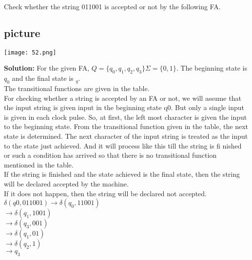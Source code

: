 \documentclass{article}
\begin{document}
\hspace*{0.1cm} Check whether the string 011001 is accepted or not by the following FA.\\
\vspace*{0.1cm}

\begin{center}
\section{picture}
\texttt{[image: 52.png]}
\end{center}

\vspace*{0.1cm}

\textbf{Solution:} For the given FA, $Q = \{q_{0}, q_{1}, q_{2}, q_{3}\} \Sigma = \{0, 1\}$. The beginning state is $q_{0}$ and the final state
is $_{q}$.\\

\hspace*{0.5cm} The transitional functions are given in the table.\\
\hspace*{0.5cm} For checking whether a string is accepted by an FA or not, we will assume that the input string is
given input in the beginning state q0. But only a single input is given in each clock pulse. So, at first,
the left most character is given the input to the beginning state. From the transitional function given in
the table, the next state is determined. The next character of the input string is treated as the input to the
state just achieved. And it will process like this till the string is fi nished or such a condition has arrived
so that there is no transitional function mentioned in the table.\\
\hspace*{0.5cm} If the string is finished and the state achieved is the final state, then the string will be declared
accepted by the machine.\\
\hspace*{0.5cm} If it does not happen, then the string will be declared not accepted.\\
\hspace*{3.4cm} $\delta(q0, 011001) \rightarrow \delta(q_{0}, 11001)$ \\
\hspace*{5cm} $\rightarrow \delta(q_{1}, 1001)$ \\
\hspace*{5cm} $\rightarrow \delta(q_{3}, 001)$ \\
\hspace*{5cm} $\rightarrow \delta(q_{1}, 01)$ \\
\hspace*{5cm} $\rightarrow \delta(q_{2}, 1)$ \\
\hspace*{5cm} $\rightarrow q_{3}$ \\
\end{document}
